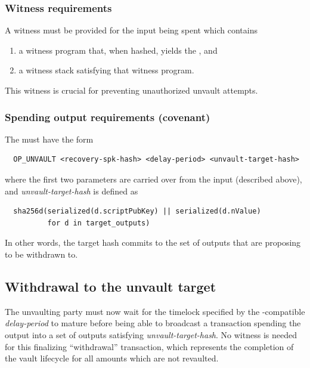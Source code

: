 \documentclass[10pt]{article}
\begin{document}
\subsubsection*{Witness requirements}

A witness must be provided for the \opv{} input being spent which contains

\begin{enumerate}
  \item a witness program \spk{} that, when hashed, yields the
    , and
  \item a witness stack satisfying that witness program.
\end{enumerate}
This witness is crucial for preventing unauthorized unvault attempts.

\subsubsection*{Spending output requirements (covenant)}

The \opuv{} \spk{} must have the form

\begin{verbatim}
  OP_UNVAULT <recovery-spk-hash> <delay-period> <unvault-target-hash> 
\end{verbatim}

\noindent where the first two parameters are carried over from the input \opv{}
(described above), and
\emph{unvault-target-hash} is defined as

\begin{verbatim}
  sha256d(serialized(d.scriptPubKey) || serialized(d.nValue)
          for d in target_outputs)
\end{verbatim}

In other words, the target hash commits to the set of outputs that are proposing to be
withdrawn to. 

\subsection*{Withdrawal to the unvault target}

The unvaulting party must now wait for the timelock specified by the
\cite{Bip68}-compatible
\emph{delay-period} to mature before being able to broadcast a transaction spending the
\opuv{} output into a set of outputs satisfying \emph{unvault-target-hash}. No witness
is needed for this finalizing ``withdrawal'' transaction, which represents the
completion of the vault lifecycle for all amounts which are not revaulted.
\end{document}
